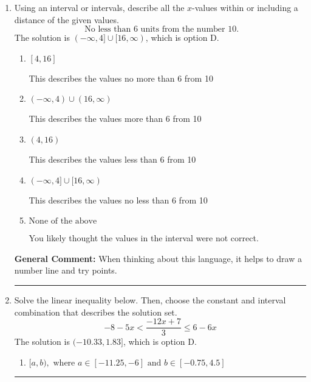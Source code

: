 \documentclass{extbook}[14pt]
\newcommand{\litem}[1]{\item #1

\rule{\textwidth}{0.4pt}}
\begin{document}
\begin{enumerate}
{\begin{enumerate}[label=\Alph*.]
$(-\infty, 2.08] \cup (-9.00, \infty)$, which corresponds to displaying the and-inequality as an or-inequality AND flipping the inequality AND getting negatives of the actual endpoints.
\item \( (-\infty, a) \cup [b, \infty), \text{ where } a \in [-0.75, 5.25] \text{ and } b \in [-11.25, -6.75] \)

$(-\infty, 2.08) \cup [-9.00, \infty)$, which corresponds to displaying the and-inequality as an or-inequality and getting negatives of the actual endpoints.
\item \( (a, b], \text{ where } a \in [-0.75, 3] \text{ and } b \in [-11.25, -8.25] \)

$(2.08, -9.00]$, which is the correct interval but negatives of the actual endpoints.
\item \( \text{None of the above.} \)

* This is correct as the answer should be $(-2.08, 9.00]$.
\end{enumerate}

\textbf{General Comment:} To solve, you will need to break up the compound inequality into two inequalities. Be sure to keep track of the inequality! It may be best to draw a number line and graph your solution.
}
\litem{
Using an interval or intervals, describe all the $x$-values within or including a distance of the given values.
\[ \text{ No less than } 6 \text{ units from the number } 10. \]The solution is \( (-\infty, 4] \cup [16, \infty) \), which is option D.\begin{enumerate}[label=\Alph*.]
\item \( [4, 16] \)

This describes the values no more than 6 from 10
\item \( (-\infty, 4) \cup (16, \infty) \)

This describes the values more than 6 from 10
\item \( (4, 16) \)

This describes the values less than 6 from 10
\item \( (-\infty, 4] \cup [16, \infty) \)

This describes the values no less than 6 from 10
\item \( \text{None of the above} \)

You likely thought the values in the interval were not correct.
\end{enumerate}

\textbf{General Comment:} When thinking about this language, it helps to draw a number line and try points.
}
\litem{
Solve the linear inequality below. Then, choose the constant and interval combination that describes the solution set.
\[ -8 - 5 x < \frac{-12 x + 7}{3} \leq 6 - 6 x \]The solution is \( (-10.33, 1.83] \), which is option D.\begin{enumerate}[label=\Alph*.]
\item \( [a, b), \text{ where } a \in [-11.25, -6] \text{ and } b \in [-0.75, 4.5] \)


\end{enumerate}}
\end{enumerate}
\end{document}
